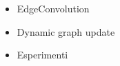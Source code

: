 \cite{Wang2019}

\begin{itemize}
    \item EdgeConvolution
    \item Dynamic graph update
    \item Esperimenti
\end{itemize}
